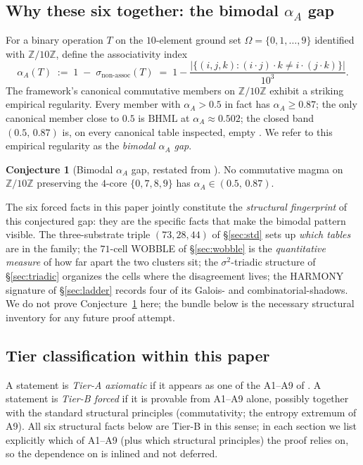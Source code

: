 \documentclass[11pt,reqno]{amsart}
\theoremstyle{plain}
\theoremstyle{definition}
\newtheorem{conjecture}[theorem]{Conjecture}
\theoremstyle{remark}
\newcommand{\Z}{\mathbb{Z}}
\newcommand{\BHML}{\mathrm{BHML}}
\begin{document}
\subsection{Why these six together: the bimodal $\alpha_A$ gap}
\label{sec:why-six}

For a binary operation $T$ on the $10$-element ground set
$\Omega=\{0,1,\dots,9\}$ identified with $\Z/10\Z$, define the
associativity index
\[
\alpha_A(T) \;:=\; 1 \;-\; \sigma_{\mathrm{non\text{-}assoc}}(T)
\;=\; 1 - \frac{|\{(i,j,k) : (i\cdot j)\cdot k \neq i\cdot(j\cdot k)\}|}{10^3}.
\]
The framework's canonical commutative members on $\Z/10\Z$ exhibit a
striking empirical regularity. Every member with $\alpha_A > 0.5$ in
fact has $\alpha_A \ge 0.87$; the only canonical member close to
$0.5$ is $\BHML$ at $\alpha_A \approx 0.502$; the closed band
$(0.5,\,0.87)$ is, on every canonical table inspected, empty
\cite[\S4]{FamilyStructureV1}. We refer to this empirical regularity
as the \emph{bimodal $\alpha_A$ gap}.

\begin{conjecture}[Bimodal $\alpha_A$ gap, restated from {\cite[\S4.1]{FamilyStructureV1}}]
\label{conj:bimodal}
No commutative magma on $\Z/10\Z$ preserving the $4$-core
$\{0,7,8,9\}$ has $\alpha_A \in (0.5,\,0.87)$.
\end{conjecture}

The six forced facts in this paper jointly constitute the
\emph{structural fingerprint} of this conjectured gap: they are the
specific facts that make the bimodal pattern visible. The
three-substrate triple $(73,28,44)$ of \S\ref{sec:std} sets up
\emph{which tables} are in the family; the $71$-cell WOBBLE of
\S\ref{sec:wobble} is the \emph{quantitative measure} of how far
apart the two clusters sit; the $\sigma^2$-triadic structure of
\S\ref{sec:triadic} organizes the cells where the disagreement
lives; the HARMONY signature of \S\ref{sec:ladder} records four of
its Galois- and combinatorial-shadows. We do not prove
Conjecture~\ref{conj:bimodal} here; the bundle below is the necessary
structural inventory for any future proof attempt.

\subsection{Tier classification within this paper}\label{sec:tier-class}

A statement is \emph{Tier-A axiomatic} if it appears as one of the
A1--A9 of \cite{SandersForcing}. A statement is \emph{Tier-B forced}
if it is provable from A1--A9 alone, possibly together with the
standard structural principles (commutativity; the entropy
extremum of A9). All six structural facts below are Tier-B in this
sense; in each section we list explicitly which of A1--A9 (plus which
structural principles) the proof relies on, so the dependence on
\cite{SandersForcing} is inlined and not deferred.
\end{document}
